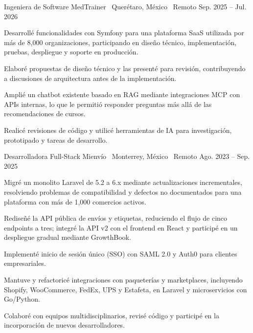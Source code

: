 
\job
{Ingeniera de Software}
{MedTrainer \textbar\ Querétaro, México \textbar\ Remoto}
{Sep. 2025 -- Jul. 2026}
{}

\begin{jobitems}

\item Desarrollé funcionalidades con Symfony para una plataforma SaaS utilizada por más de 8,000 organizaciones, participando en diseño técnico, implementación, pruebas, despliegue y soporte en producción.

\item Elaboré propuestas de diseño técnico y las presenté para revisión, contribuyendo a discusiones de arquitectura antes de la implementación.

\item Amplié un chatbot existente basado en RAG mediante integraciones MCP con APIs internas, lo que le permitió responder preguntas más allá de las recomendaciones de cursos.

\item Realicé revisiones de código y utilicé herramientas de IA para investigación, prototipado y tareas de desarrollo.

\end{jobitems}


\job
{Desarrolladora Full-Stack}
{Mienvío \textbar\ Monterrey, México \textbar\ Remoto}
{Ago. 2023 -- Sep. 2025}
{}

\begin{jobitems}

\item Migré un monolito Laravel de 5.2 a 6.x mediante actualizaciones incrementales, resolviendo problemas de compatibilidad y defectos no documentados para una plataforma con más de 1,000 comercios activos.

\item Rediseñé la API pública de envíos y etiquetas, reduciendo el flujo de cinco endpoints a tres; integré la API v2 con el frontend en React y participé en un despliegue gradual mediante GrowthBook.

\item Implementé inicio de sesión único (SSO) con SAML 2.0 y Auth0 para clientes empresariales.

\item Mantuve y refactoricé integraciones con paqueterías y marketplaces, incluyendo Shopify, WooCommerce, FedEx, UPS y Estafeta, en Laravel y microservicios con Go/Python.

\item Colaboré con equipos multidisciplinarios, revisé código y participé en la incorporación de nuevos desarrolladores.

\end{jobitems}


